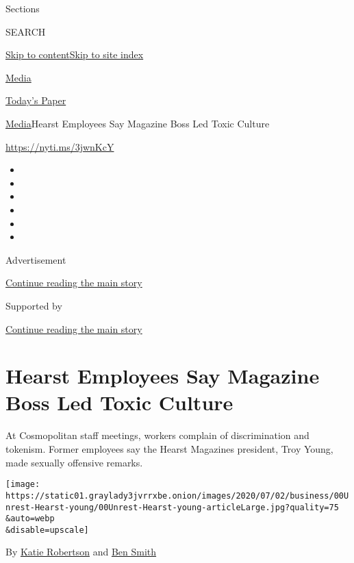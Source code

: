 Sections

SEARCH

\protect\hyperlink{site-content}{Skip to
content}\protect\hyperlink{site-index}{Skip to site index}

\href{https://www.nytimes3xbfgragh.onion/section/business/media}{Media}

\href{https://myaccount.nytimes3xbfgragh.onion/auth/login?response_type=cookie\&client_id=vi}{}

\href{https://www.nytimes3xbfgragh.onion/section/todayspaper}{Today's
Paper}

\href{/section/business/media}{Media}\textbar{}Hearst Employees Say
Magazine Boss Led Toxic Culture

\href{https://nyti.ms/3jwnKcY}{https://nyti.ms/3jwnKcY}

\begin{itemize}
\item
\item
\item
\item
\item
\item
\end{itemize}

Advertisement

\protect\hyperlink{after-top}{Continue reading the main story}

Supported by

\protect\hyperlink{after-sponsor}{Continue reading the main story}

\hypertarget{hearst-employees-say-magazine-boss-led-toxic-culture}{%
\section{Hearst Employees Say Magazine Boss Led Toxic
Culture}\label{hearst-employees-say-magazine-boss-led-toxic-culture}}

At Cosmopolitan staff meetings, workers complain of discrimination and
tokenism. Former employees say the Hearst Magazines president, Troy
Young, made sexually offensive remarks.

\texttt{[image: https://static01.graylady3jvrrxbe.onion/images/2020/07/02/business/00Unrest-Hearst-young/00Unrest-Hearst-young-articleLarge.jpg?quality=75\\\&auto=webp\\\&disable=upscale]}

By \href{https://www.nytimes3xbfgragh.onion/by/katie-robertson}{Katie
Robertson} and
\href{https://www.nytimes3xbfgragh.onion/by/ben-smith}{Ben Smith}


